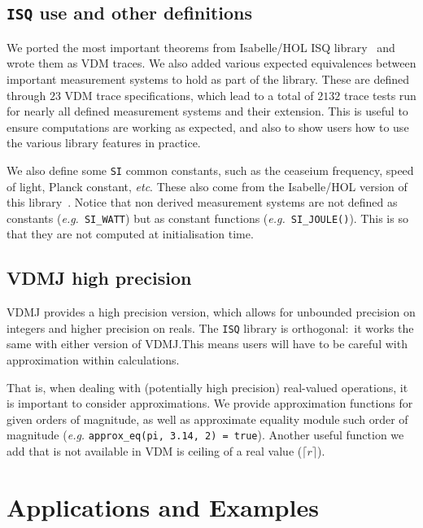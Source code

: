 \documentclass[runningheads,a4paper]{llncs}
\begin{document}
\subsection*{\texttt{ISQ} use and other definitions}

We ported the most important theorems from Isabelle/HOL ISQ library~\cite{Physical_Quantities-AFP} and wrote them as VDM traces. We also added various expected equivalences between important measurement systems to hold as part of the library. These are defined through \(23\) VDM trace specifications, which lead to a total of \(2132\) trace tests run for nearly all defined measurement systems and their extension. This is useful to ensure computations are working as expected, and also to show users how to use the various library features in practice. 

We also define some \texttt{SI} common constants, such as the ceaseium frequency, speed of light, Planck constant, \textit{etc}. These also come from the Isabelle/HOL version of this library~\cite{Physical_Quantities-AFP}. Notice that non derived measurement systems are not defined as constants (\textit{e.g.}~\texttt{SI\_WATT}) but as constant functions (\textit{e.g.}~\texttt{SI\_JOULE()}). This is so that they are not computed at initialisation time.  

\subsection*{VDMJ high precision}

VDMJ provides a high precision version, which allows for unbounded precision on integers and higher precision on reals. The \texttt{ISQ} library is orthogonal:~it works the same with either version of VDMJ.\@ This means users will have to be careful with approximation within calculations.\@  

That is, when dealing with (potentially high precision) real-valued operations, it is important to consider approximations. We provide approximation functions for given orders of magnitude, as well as approximate equality module such order of magnitude (\textit{e.g.} \texttt{approx\_eq(pi, 3.14, 2) = true}). Another useful function we add that is not available in VDM is ceiling of a real value (\(\lceil r \rceil\)). 

\section{Applications and Examples}\label{sec:Examples}
\end{document}
